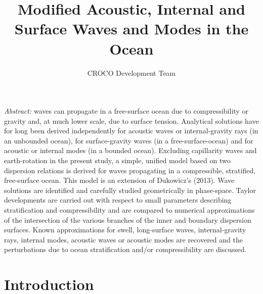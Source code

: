 \documentclass[a4paper,11pt]{article}
\title{Modified Acoustic, Internal and Surface Waves and Modes in the Ocean}
\author{CROCO Development Team}
\begin{document}
\renewcommand{\thepage}{}
\hypersetup{pdfborder=0 0 0}
\maketitle
\setcounter{tocdepth}{2}

\let\oldref\ref
\renewcommand{\ref}[1]{(\oldref{#1})}


\textit{Abstract:} waves can propagate in a free-surface ocean due to compressibility or gravity and, at much lower scale, due to surface tension. Analytical solutions have for long been derived independently for acoustic waves or internal-gravity rays (in an unbounded ocean), for surface-gravity waves (in a free-surface-ocean) and for acoustic or internal modes (in a bounded ocean). Excluding capillarity waves and earth-rotation in the present study, a simple, unified model based on two dispersion relations is derived for waves propagating in a compressible, stratified, free-surface ocean. This model is an extension of Dukowicz's (2013). Wave solutions are identified and carefully studied geometrically in phase-space. Taylor developments are carried out with respect to small parameters describing stratification and compressibility and are compared to numerical approximations of the intersection of the various branches of the inner and boundary dispersion surfaces. Known approximations for swell, long-surface waves, internal-gravity rays, internal modes, acoustic waves or acoustic modes are recovered and the perturbations due to ocean stratification and/or compressibility are discussed.\\

\newpage
\renewcommand{\thepage}{\arabic{page}}
\setcounter{page}{1}

\section{Introduction}
\end{document}

